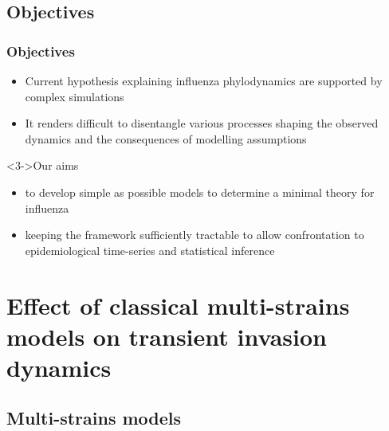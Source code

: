 \documentclass{beamer}
\begin{document}
\subsection{Objectives}

\begin{frame}
  \frametitle{Objectives}
  \begin{itemize}
  \item<1-> Current hypothesis explaining influenza phylodynamics are
    supported by complex simulations
  \item<2-> It renders difficult to disentangle various processes shaping
    the observed dynamics and the consequences of modelling assumptions
  \end{itemize}


  \begin{block}<3->{Our aims}
    \begin{itemize}
    \item<3-> to develop simple as possible models to determine a minimal
      theory for influenza
    \item<4-> keeping the framework sufficiently tractable to allow
      confrontation to epidemiological time-series and statistical
      inference
    \end{itemize}
  \end{block}

\end{frame}


\section[Multi-strains models]{Effect of classical multi-strains models on transient
  invasion dynamics}

\subsection{Multi-strains models}
\end{document}
